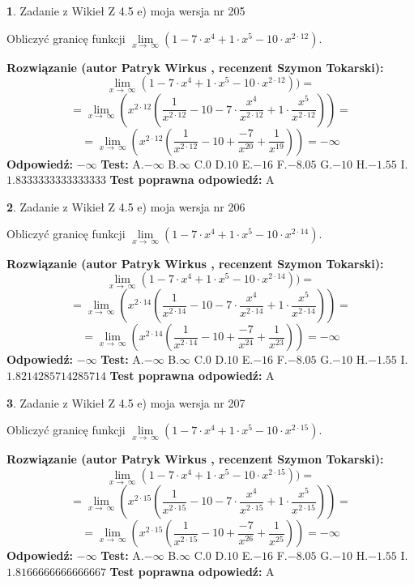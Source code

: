 \documentclass[12pt, a4paper]{article}
\theoremstyle{definition} %
\newtheorem{zad}{}
\newcommand{\zadStart}[1]{\begin{zad}#1\newline}
\newcommand{\zadStop}{\end{zad}}
\newcommand{\rozwStart}[2]{\noindent \textbf{Rozwiązanie (autor #1 , recenzent #2): }\newline}
\newcommand{\rozwStop}{\newline}
\newcommand{\odpStart}{\noindent \textbf{Odpowiedź:}\newline}
\newcommand{\odpStop}{\newline}
\newcommand{\testStart}{\noindent \textbf{Test:}\newline}
\newcommand{\testStop}{\newline}
\newcommand{\kluczStart}{\noindent \textbf{Test poprawna odpowiedź:}\newline}
\newcommand{\kluczStop}{\newline}
\begin{document}
\zadStart{Zadanie z Wikieł Z 4.5 e) moja wersja nr 205}


Obliczyć granicę funkcji  $\lim\limits_{x\to\ \infty}(1 - 7 \cdot x^{4}+1 \cdot x^{5}- 10 \cdot x^{2\cdot12})$.
\zadStop
\rozwStart{Patryk Wirkus}{Szymon Tokarski}
$$\lim\limits_{x\to\ \infty}(1 - 7 \cdot x^{4}+1 \cdot x^{5}- 10 \cdot x^{2\cdot12}))=$$
$$=\lim\limits_{x\to\ \infty}(x^{2\cdot12}(\frac{1}{x^{2\cdot12}}-10 -7 \cdot \frac{x^{4}}{x^{2\cdot12}}+1 \cdot \frac{x^{5}}{x^{2\cdot12}}))=$$
$$=\lim\limits_{x\to\ \infty}(x^{2\cdot12}(\frac{1}{x^{2\cdot12}}-10 + \frac{-7}{x^{20}}+ \frac{1}{x^{19}}))=-\infty$$
\rozwStop
\odpStart
$-\infty$
\odpStop
\testStart
A.$-\infty$ B.$\infty$ C.$0$ D.$10$ E.$-16$
F.$-8.05$ G.$-10$
H.$-1.55$
I.$1.8333333333333333$
\testStop
\kluczStart
A
\kluczStop



\zadStart{Zadanie z Wikieł Z 4.5 e) moja wersja nr 206}


Obliczyć granicę funkcji  $\lim\limits_{x\to\ \infty}(1 - 7 \cdot x^{4}+1 \cdot x^{5}- 10 \cdot x^{2\cdot14})$.
\zadStop
\rozwStart{Patryk Wirkus}{Szymon Tokarski}
$$\lim\limits_{x\to\ \infty}(1 - 7 \cdot x^{4}+1 \cdot x^{5}- 10 \cdot x^{2\cdot14}))=$$
$$=\lim\limits_{x\to\ \infty}(x^{2\cdot14}(\frac{1}{x^{2\cdot14}}-10 -7 \cdot \frac{x^{4}}{x^{2\cdot14}}+1 \cdot \frac{x^{5}}{x^{2\cdot14}}))=$$
$$=\lim\limits_{x\to\ \infty}(x^{2\cdot14}(\frac{1}{x^{2\cdot14}}-10 + \frac{-7}{x^{24}}+ \frac{1}{x^{23}}))=-\infty$$
\rozwStop
\odpStart
$-\infty$
\odpStop
\testStart
A.$-\infty$ B.$\infty$ C.$0$ D.$10$ E.$-16$
F.$-8.05$ G.$-10$
H.$-1.55$
I.$1.8214285714285714$
\testStop
\kluczStart
A
\kluczStop



\zadStart{Zadanie z Wikieł Z 4.5 e) moja wersja nr 207}


Obliczyć granicę funkcji  $\lim\limits_{x\to\ \infty}(1 - 7 \cdot x^{4}+1 \cdot x^{5}- 10 \cdot x^{2\cdot15})$.
\zadStop
\rozwStart{Patryk Wirkus}{Szymon Tokarski}
$$\lim\limits_{x\to\ \infty}(1 - 7 \cdot x^{4}+1 \cdot x^{5}- 10 \cdot x^{2\cdot15}))=$$
$$=\lim\limits_{x\to\ \infty}(x^{2\cdot15}(\frac{1}{x^{2\cdot15}}-10 -7 \cdot \frac{x^{4}}{x^{2\cdot15}}+1 \cdot \frac{x^{5}}{x^{2\cdot15}}))=$$
$$=\lim\limits_{x\to\ \infty}(x^{2\cdot15}(\frac{1}{x^{2\cdot15}}-10 + \frac{-7}{x^{26}}+ \frac{1}{x^{25}}))=-\infty$$
\rozwStop
\odpStart
$-\infty$
\odpStop
\testStart
A.$-\infty$ B.$\infty$ C.$0$ D.$10$ E.$-16$
F.$-8.05$ G.$-10$
H.$-1.55$
I.$1.8166666666666667$
\testStop
\kluczStart
A
\kluczStop
\end{document}
